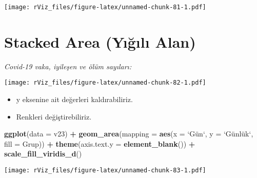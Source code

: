\documentclass[
]{book}
\newenvironment{Shaded}{\begin{snugshade}}{\end{snugshade}}
\newcommand{\CommentTok}[1]{\textcolor[rgb]{0.56,0.35,0.01}{\textit{#1}}}
\newcommand{\DataTypeTok}[1]{\textcolor[rgb]{0.13,0.29,0.53}{#1}}
\newcommand{\KeywordTok}[1]{\textcolor[rgb]{0.13,0.29,0.53}{\textbf{#1}}}
\newcommand{\NormalTok}[1]{#1}
\newcommand{\OperatorTok}[1]{\textcolor[rgb]{0.81,0.36,0.00}{\textbf{#1}}}
\newcommand{\StringTok}[1]{\textcolor[rgb]{0.31,0.60,0.02}{#1}}
\begin{document}
\texttt{[image: rViz\_files/figure-latex/unnamed-chunk-81-1.pdf]}

\hypertarget{stacked-area-yux131ux11fux131lux131-alan}{%
\section{Stacked Area (Yığılı Alan)}\label{stacked-area-yux131ux11fux131lux131-alan}}

\emph{Covid-19 vaka, iyileşen ve ölüm sayıları:}

\begin{Shaded}
\end{Shaded}

\texttt{[image: rViz\_files/figure-latex/unnamed-chunk-82-1.pdf]}

\begin{itemize}
\item
  y eksenine ait değerleri kaldırabiliriz.
\item
  Renkleri değiştirebiliriz.
\end{itemize}

\begin{Shaded}
\begin{Highlighting}[]
\KeywordTok{ggplot}\NormalTok{(}\DataTypeTok{data =}\NormalTok{ v23) }\OperatorTok{+}
\StringTok{  }\KeywordTok{geom_area}\NormalTok{(}\DataTypeTok{mapping =} \KeywordTok{aes}\NormalTok{(}\DataTypeTok{x =} \StringTok{`}\DataTypeTok{Gün`, y = }\StringTok{`}\NormalTok{Günlük`, }\DataTypeTok{fill =}\NormalTok{ Grup)) }\OperatorTok{+}
\StringTok{  }\KeywordTok{theme}\NormalTok{(}\DataTypeTok{axis.text.y =} \KeywordTok{element_blank}\NormalTok{()) }\OperatorTok{+}
\StringTok{  }\KeywordTok{scale_fill_viridis_d}\NormalTok{()}
\end{Highlighting}
\end{Shaded}

\texttt{[image: rViz\_files/figure-latex/unnamed-chunk-83-1.pdf]}
\end{document}
